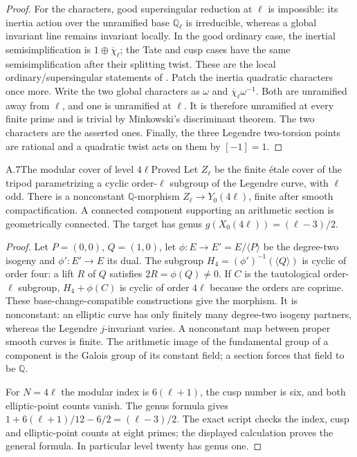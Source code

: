 \begin{proof}
For the characters, good supersingular reduction at $\ell$ is impossible:
its inertia action over the unramified base $\mathbb Q_\ell$ is
irreducible, whereas a global invariant line remains invariant locally.
In the good ordinary case, the inertial semisimplification is
$1\oplus\overline\chi_\ell$; the Tate and cusp cases have the same
semisimplification after their splitting twist. These are the local
ordinary/supersingular statements of \citet[Propositions 11--12]{AMSerre1972}.
Patch the inertia quadratic characters once more. Write the two global
characters as $\omega$ and $\overline\chi_\ell\omega^{-1}$. Both are
unramified away from $\ell$, and one is unramified at $\ell$. It is
therefore unramified at every finite prime and is trivial by Minkowski's
discriminant theorem. The two characters are the asserted ones.
Finally, the three Legendre two-torsion points are rational and a
quadratic twist acts on them by $[-1]=1$.
\end{proof}

\begin{statement}{A.7}{The modular cover of level $4\ell$}{Proved}
Let $Z_\ell$ be the finite \'etale cover of the tripod parametrizing a cyclic
order-$\ell$ subgroup of the Legendre curve, with $\ell$ odd. There is a
nonconstant $\mathbb Q$-morphism $Z_\ell\to Y_0(4\ell)$, finite after
smooth compactification. A connected component supporting an arithmetic
section is geometrically connected. The target has genus
$g(X_0(4\ell))=(\ell-3)/2$.
\end{statement}
\begin{proof}
Let $P=(0,0)$, $Q=(1,0)$, let $\phi:E\to E'=E/\langle P\rangle$
be the degree-two isogeny and $\phi':E'\to E$ its dual. The subgroup
$H_4=(\phi')^{-1}(\langle Q\rangle)$ is cyclic of order four: a lift
$R$ of $Q$ satisfies $2R=\phi(Q)\ne0$. If $C$ is the tautological
order-$\ell$ subgroup, $H_4+\phi(C)$ is cyclic of order $4\ell$ because
the orders are coprime. These base-change-compatible constructions give
the morphism. It is nonconstant: an elliptic curve has only finitely many
degree-two isogeny partners, whereas the Legendre $j$-invariant varies.
A nonconstant map between proper smooth curves is finite. The arithmetic
image of the fundamental group of a component is the Galois group of its
constant field; a section forces that field to be $\mathbb Q$.

For $N=4\ell$ the modular index is $6(\ell+1)$, the cusp number is
six, and both elliptic-point counts vanish. The genus formula gives
$1+6(\ell+1)/12-6/2=(\ell-3)/2$. The exact script checks the index,
cusp and elliptic-point counts at eight primes; the displayed calculation
proves the general formula. In particular level twenty has genus one.
\end{proof}

